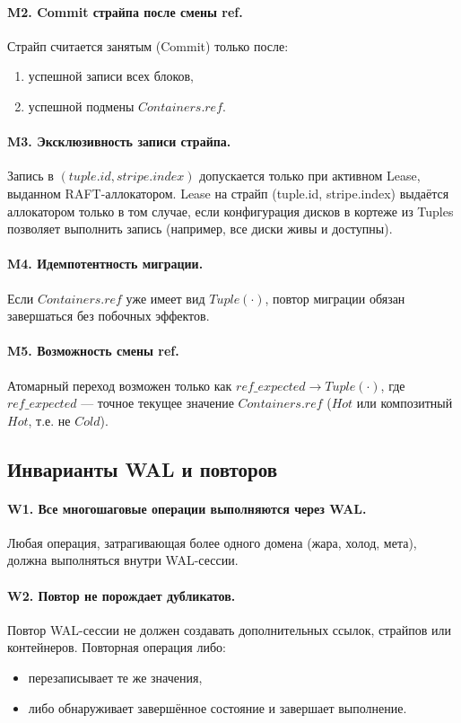 \documentclass[a4paper,12pt]{article}
\begin{document}
\paragraph{M2. Commit страйпа после смены ref.}
Страйп считается занятым (Commit) только после:
\begin{enumerate}
    \item успешной записи всех блоков,
    \item успешной подмены $Containers.ref$.
\end{enumerate}

\paragraph{M3. Эксклюзивность записи страйпа.}
Запись в $(tuple.id, stripe.index)$ допускается только при активном Lease,
выданном RAFT-аллокатором. Lease на страйп (tuple.id, stripe.index) выдаётся аллокатором только в том случае,
если конфигурация дисков в кортеже из Tuples позволяет выполнить запись (например, все диски живы и доступны).

\paragraph{M4. Идемпотентность миграции.}
Если $Containers.ref$ уже имеет вид $Tuple(\cdot)$, повтор миграции
обязан завершаться без побочных эффектов.

\paragraph{M5. Возможность смены ref.}
Атомарный переход возможен только как $ref\_expected \rightarrow Tuple(\cdot)$, где $ref\_expected$ —
точное текущее значение $Containers.ref$ ($Hot$ или композитный $Hot$, т.е. не $Cold$).

\subsection{Инварианты WAL и повторов}

\paragraph{W1. Все многошаговые операции выполняются через WAL.}
Любая операция, затрагивающая более одного домена
(жара, холод, мета), должна выполняться внутри WAL-сессии.

\paragraph{W2. Повтор не порождает дубликатов.}
Повтор WAL-сессии не должен создавать дополнительных ссылок,
страйпов или контейнеров. Повторная операция либо:
\begin{itemize}
    \item перезаписывает те же значения,
    \item либо обнаруживает завершённое состояние и завершает выполнение.
\end{itemize}
\end{document}
